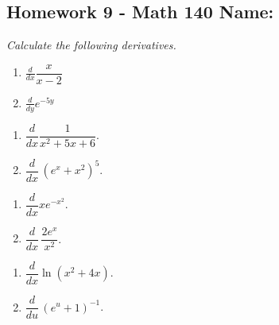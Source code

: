 \documentclass[10pt]{article}
\newcommand{\ds}{\displaystyle}
\begin{document}
\pagestyle{empty}
\subsection*{Homework 9 - Math 140 \hfill Name: \underline{\hspace*{2in}}}


\noindent
\textit{Calculate the following derivatives.}
\begin{multicols}{2}
\begin{enumerate}
\item $\ds \frac{d}{dx} \dfrac{x}{x-2}$ 


\item $\ds \frac{d}{dy} e^{-5y}$ 

\setcounter{enumCount}{\theenumi}
\end{enumerate} 
\end{multicols}

\vfill


\begin{multicols}{2}
\begin{enumerate}
\setcounter{enumi}{\theenumCount}
\item $\ds \dfrac{d}{dx} \dfrac{1}{x^2 + 5x + 6}$.


\item $\ds \dfrac{d}{dx} \, (e^x + x^2)^5$.


\setcounter{enumCount}{\theenumi}
\end{enumerate} 
\end{multicols}
\vfill

\begin{multicols}{2}
\begin{enumerate}
\setcounter{enumi}{\theenumCount}
\item $\ds \dfrac{d}{dx} x e^{-x^2}$.


\item $\ds \dfrac{d}{dx} \, \dfrac{2e^x}{x^2}$.


\setcounter{enumCount}{\theenumi}
\end{enumerate} 
\end{multicols}
\vfill


\begin{multicols}{2}
\begin{enumerate}
\setcounter{enumi}{\theenumCount}
\item $\ds \dfrac{d}{dx} \ln(x^2 + 4 x)$.


\item $\ds \dfrac{d}{du} \, (e^{u}+1)^{-1}$.


\setcounter{enumCount}{\theenumi}
\end{enumerate} 
\end{multicols}
\vfill
\end{document}
